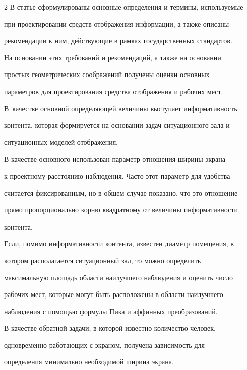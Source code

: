 \begin{multicols}{2}
В статье сформулированы основные определения и термины, используемые 


при проектировании средств отображения информации, а также описаны 


рекомендации к ним, действующие в рамках государственных стандартов.





На основании этих требований и рекомендаций, а также на основании 


простых геометрических соображений получены оценки основных 


параметров для проектирования средства отображения и рабочих мест. 


В~качестве основной определяющей величины выступает информативность 


контента, которая формируется на основании задач ситуационного зала и 


ситуационных моделей отображения.


     


     В качестве основного использован параметр отношения ширины экрана 


к проектному расстоянию наблюдения. Часто этот параметр для удобства 


считается фиксированным, но в общем случае показано, что это отношение 


прямо пропорционально корню квадратному от величины информативности 


контента.


    


Если, помимо информативности контента, известен диаметр помещения, в 


котором располагается ситуационный зал, то можно определить 


максимальную площадь области наилучшего наблюдения и оценить число 


рабочих мест, которые могут быть расположены в области наилучшего 


наблюдения с помощью формулы Пика и аффинных преобразований.





В качестве обратной задачи, в которой известно количество человек, 


одновременно работающих с экраном, получена зависимость для 


определения минимально необходимой ширина экрана.






\end{multicols}
